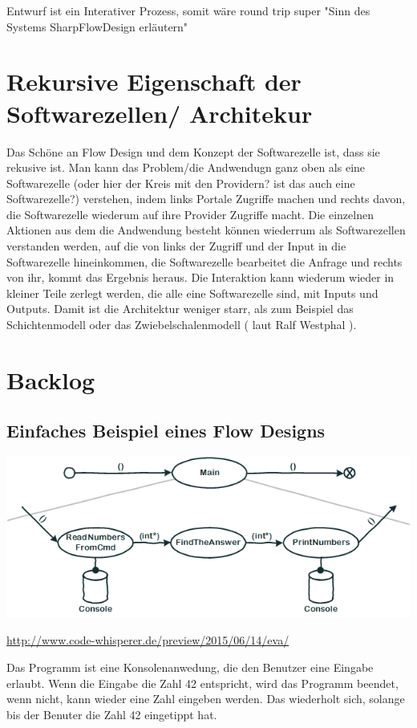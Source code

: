 \documentclass[11pt]{article}
\begin{document}
Entwurf ist ein Interativer Prozess, somit wäre round trip super "Sinn des Systems SharpFlowDesign erläutern"



\section{Rekursive Eigenschaft der Softwarezellen/ Architekur}
\label{sec:orgheadline50}
Das Schöne an Flow Design und dem Konzept der Softwarezelle ist, dass sie rekusive ist.
Man kann das Problem/die Andwendugn ganz oben als eine Softwarezelle (oder hier der Kreis mit den Providern? ist das auch eine Softwarezelle?)
verstehen, indem links Portale Zugriffe machen und rechts davon, die Softwarezelle wiederum auf ihre Provider Zugriffe macht.
Die einzelnen Aktionen aus dem die Andwendung besteht können wiederrum als Softwarezellen verstanden werden, auf die von links 
der Zugriff und der Input in die Softwarezelle hineinkommen, die Softwarezelle bearbeitet die Anfrage und rechts von ihr, kommt das
Ergebnis heraus. Die Interaktion kann wiederum wieder in kleiner Teile zerlegt werden, die alle eine Softwarezelle sind, mit Inputs und
Outputs. Damit ist die Architektur weniger starr, als zum Beispiel das Schichtenmodell oder das Zwiebelschalenmodell ( laut Ralf Westphal ). 



\section{Backlog}
\label{sec:orgheadline55}
\subsection{Einfaches Beispiel eines Flow Designs}
\label{sec:orgheadline54}

\includegraphics[width=.9\linewidth]{./img/FlowDesign2.png}

\url{http://www.code-whisperer.de/preview/2015/06/14/eva/}

Das Programm ist eine Konsolenanwedung, die den Benutzer eine Eingabe erlaubt.
Wenn die Eingabe die Zahl 42 entspricht, wird das Programm beendet, wenn nicht, kann wieder eine Zahl eingeben werden.
Das wiederholt sich, solange bis der Benuter die Zahl 42 eingetippt hat.
\end{document}

